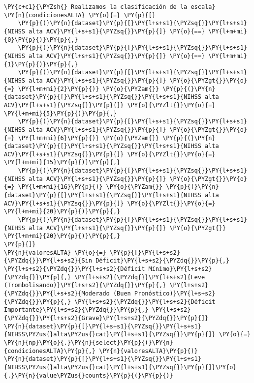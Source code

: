     \begin{tcolorbox}[breakable, size=fbox, boxrule=1pt, pad at break*=1mm,colback=cellbackground, colframe=cellborder]
\begin{Verbatim}[commandchars=\\\{\}]
\PY{c+c1}{\PYZsh{} Realizamos la clasificación de la escala}
\PY{n}{condicionesALTA} \PY{o}{=} \PY{p}{[}
    \PY{p}{(}\PY{n}{dataset}\PY{p}{[}\PY{l+s+s1}{\PYZsq{}}\PY{l+s+s1}{NIHSS alta ACV}\PY{l+s+s1}{\PYZsq{}}\PY{p}{]} \PY{o}{==} \PY{l+m+mi}{0}\PY{p}{)}\PY{p}{,}
    \PY{p}{(}\PY{n}{dataset}\PY{p}{[}\PY{l+s+s1}{\PYZsq{}}\PY{l+s+s1}{NIHSS alta ACV}\PY{l+s+s1}{\PYZsq{}}\PY{p}{]} \PY{o}{==} \PY{l+m+mi}{1}\PY{p}{)}\PY{p}{,}
    \PY{p}{(}\PY{n}{dataset}\PY{p}{[}\PY{l+s+s1}{\PYZsq{}}\PY{l+s+s1}{NIHSS alta ACV}\PY{l+s+s1}{\PYZsq{}}\PY{p}{]} \PY{o}{\PYZgt{}}\PY{o}{=} \PY{l+m+mi}{2}\PY{p}{)} \PY{o}{\PYZam{}} \PY{p}{(}\PY{n}{dataset}\PY{p}{[}\PY{l+s+s1}{\PYZsq{}}\PY{l+s+s1}{NIHSS alta ACV}\PY{l+s+s1}{\PYZsq{}}\PY{p}{]} \PY{o}{\PYZlt{}}\PY{o}{=} \PY{l+m+mi}{5}\PY{p}{)}\PY{p}{,}
    \PY{p}{(}\PY{n}{dataset}\PY{p}{[}\PY{l+s+s1}{\PYZsq{}}\PY{l+s+s1}{NIHSS alta ACV}\PY{l+s+s1}{\PYZsq{}}\PY{p}{]} \PY{o}{\PYZgt{}}\PY{o}{=} \PY{l+m+mi}{6}\PY{p}{)} \PY{o}{\PYZam{}} \PY{p}{(}\PY{n}{dataset}\PY{p}{[}\PY{l+s+s1}{\PYZsq{}}\PY{l+s+s1}{NIHSS alta ACV}\PY{l+s+s1}{\PYZsq{}}\PY{p}{]} \PY{o}{\PYZlt{}}\PY{o}{=} \PY{l+m+mi}{15}\PY{p}{)}\PY{p}{,}
    \PY{p}{(}\PY{n}{dataset}\PY{p}{[}\PY{l+s+s1}{\PYZsq{}}\PY{l+s+s1}{NIHSS alta ACV}\PY{l+s+s1}{\PYZsq{}}\PY{p}{]} \PY{o}{\PYZgt{}}\PY{o}{=} \PY{l+m+mi}{16}\PY{p}{)} \PY{o}{\PYZam{}} \PY{p}{(}\PY{n}{dataset}\PY{p}{[}\PY{l+s+s1}{\PYZsq{}}\PY{l+s+s1}{NIHSS alta ACV}\PY{l+s+s1}{\PYZsq{}}\PY{p}{]} \PY{o}{\PYZlt{}}\PY{o}{=} \PY{l+m+mi}{20}\PY{p}{)}\PY{p}{,}
    \PY{p}{(}\PY{n}{dataset}\PY{p}{[}\PY{l+s+s1}{\PYZsq{}}\PY{l+s+s1}{NIHSS alta ACV}\PY{l+s+s1}{\PYZsq{}}\PY{p}{]} \PY{o}{\PYZgt{}} \PY{l+m+mi}{20}\PY{p}{)}\PY{p}{,}
\PY{p}{]}
\PY{n}{valoresALTA} \PY{o}{=} \PY{p}{[}\PY{l+s+s2}{\PYZdq{}}\PY{l+s+s2}{Sin Déficit}\PY{l+s+s2}{\PYZdq{}}\PY{p}{,} \PY{l+s+s2}{\PYZdq{}}\PY{l+s+s2}{Déficit Mínimo}\PY{l+s+s2}{\PYZdq{}}\PY{p}{,} \PY{l+s+s2}{\PYZdq{}}\PY{l+s+s2}{Leve (Trombolisando)}\PY{l+s+s2}{\PYZdq{}}\PY{p}{,} \PY{l+s+s2}{\PYZdq{}}\PY{l+s+s2}{Moderado (Buen Pronóstico)}\PY{l+s+s2}{\PYZdq{}}\PY{p}{,} \PY{l+s+s2}{\PYZdq{}}\PY{l+s+s2}{Déficit Importante}\PY{l+s+s2}{\PYZdq{}}\PY{p}{,} \PY{l+s+s2}{\PYZdq{}}\PY{l+s+s2}{Grave}\PY{l+s+s2}{\PYZdq{}}\PY{p}{]}
\PY{n}{dataset}\PY{p}{[}\PY{l+s+s1}{\PYZsq{}}\PY{l+s+s1}{NIHSS\PYZus{}alta\PYZus{}cat}\PY{l+s+s1}{\PYZsq{}}\PY{p}{]} \PY{o}{=} \PY{n}{np}\PY{o}{.}\PY{n}{select}\PY{p}{(}\PY{n}{condicionesALTA}\PY{p}{,} \PY{n}{valoresALTA}\PY{p}{)}
\PY{n}{dataset}\PY{p}{[}\PY{l+s+s1}{\PYZsq{}}\PY{l+s+s1}{NIHSS\PYZus{}alta\PYZus{}cat}\PY{l+s+s1}{\PYZsq{}}\PY{p}{]}\PY{o}{.}\PY{n}{value\PYZus{}counts}\PY{p}{(}\PY{p}{)}
\end{Verbatim}
\end{tcolorbox}


